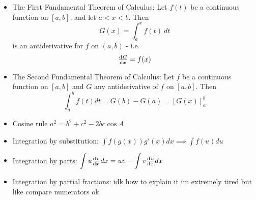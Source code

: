 \documentclass{article}
\begin{document}
\begin{multicols}{2}
\begin{itemize}[leftmargin=0.5cm]
    \item The First Fundamental Theorem of Calculus: Let $f(t)$ be a continuous function on $[a,b]$, and let $a<x<b$. Then $$G(x)=\int^x_af(t)\ dt$$ is an antiderivative for $f$ on $(a,b)$ - i.e. $$\od{G}{x}=f(x)$$
    \item The Second Fundamental Theorem of Calculus: Let $f$ be a continuous function on $[a,b]$ and $G$ any antiderivative of $f$ on $[a,b]$. Then $$\int^b_af(t)dt=G(b)-G(a)=[G(x)]^b_a$$
    \item Cosine rule $a^2=b^2+c^2-2bc\cos{A}$
    \item Integration by substitution: $\displaystyle\int f(g(x))g'(x)dx\implies\displaystyle\int f(u)du$
    \item Integration by parts: $\displaystyle\int u\od{v}{x}dx=uv-\displaystyle\int v\od{u}{x}dx$
    \item Integration by partial fractions: idk how to explain it im extremely tired but like compare numerators ok
\end{itemize}
\end{multicols}
\end{document}
